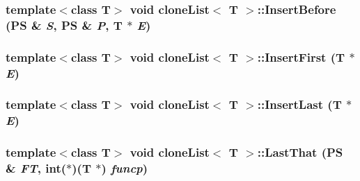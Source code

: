 \hypertarget{classclone_list_a06a7e1332f87a0ace2d6b4293ba9f152}{
\subsubsection[{InsertBefore}]{\setlength{\rightskip}{0pt plus 5cm}template$<$class T$>$ void {\bf cloneList}$<$ T $>$::InsertBefore ({\bf PS} \& {\em S}, \/  {\bf PS} \& {\em P}, \/  T $\ast$ {\em E})}}
\label{classclone_list_a06a7e1332f87a0ace2d6b4293ba9f152}
\hypertarget{classclone_list_a56a0c2c564dd251e6f9db7061370e1dc}{
\subsubsection[{InsertFirst}]{\setlength{\rightskip}{0pt plus 5cm}template$<$class T$>$ void {\bf cloneList}$<$ T $>$::InsertFirst (T $\ast$ {\em E})}}
\label{classclone_list_a56a0c2c564dd251e6f9db7061370e1dc}
\hypertarget{classclone_list_a14b4adf5b6e8ca8e6d262afcdb3cc42b}{
\subsubsection[{InsertLast}]{\setlength{\rightskip}{0pt plus 5cm}template$<$class T$>$ void {\bf cloneList}$<$ T $>$::InsertLast (T $\ast$ {\em E})}}
\label{classclone_list_a14b4adf5b6e8ca8e6d262afcdb3cc42b}
\hypertarget{classclone_list_a5aca1d18d864f64a22a7f148e4e77dbf}{
\subsubsection[{LastThat}]{\setlength{\rightskip}{0pt plus 5cm}template$<$class T$>$ void {\bf cloneList}$<$ T $>$::LastThat ({\bf PS} \& {\em FT}, \/  int($\ast$)(T $\ast$) {\em funcp})}}
\label{classclone_list_a5aca1d18d864f64a22a7f148e4e77dbf}
